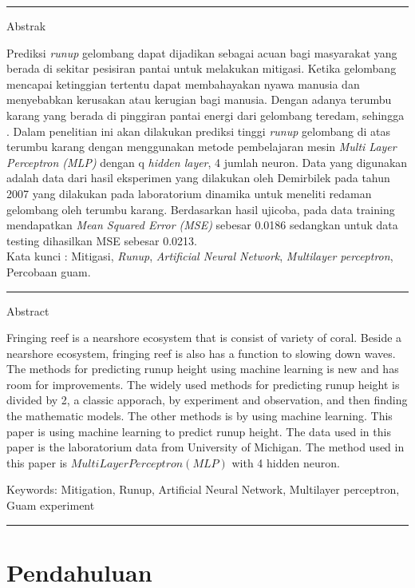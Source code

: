 {\bf \parindent0pt \noindent\rule{\textwidth}{1pt}
Abstrak

Prediksi \emph{runup} gelombang dapat dijadikan sebagai acuan bagi masyarakat yang berada di sekitar pesisiran pantai untuk melakukan mitigasi. Ketika gelombang mencapai ketinggian tertentu dapat membahayakan nyawa manusia dan menyebabkan kerusakan atau kerugian bagi manusia. Dengan adanya terumbu karang yang berada di pinggiran pantai energi dari gelombang teredam, sehingga . Dalam penelitian ini akan dilakukan prediksi tinggi \emph{runup} gelombang di atas terumbu karang dengan menggunakan metode pembelajaran mesin \emph{Multi Layer Perceptron (MLP)} dengan q \emph{hidden layer}, 4 jumlah neuron. Data yang digunakan adalah data dari hasil eksperimen yang dilakukan oleh Demirbilek pada tahun 2007 yang dilakukan pada laboratorium dinamika untuk meneliti redaman gelombang oleh terumbu karang. Berdasarkan hasil ujicoba, pada data training mendapatkan \emph{Mean Squared Error (MSE)} sebesar 0.0186 sedangkan untuk data testing dihasilkan MSE sebesar 0.0213.\\

Kata kunci : Mitigasi, \emph{Runup}, \emph{Artificial Neural Network}, \emph{Multilayer perceptron}, Percobaan guam.


\noindent\rule{\textwidth}{1pt}
Abstract

Fringing reef is a nearshore ecosystem that is consist of variety of coral. Beside a nearshore ecosystem, fringing reef is also has a function to slowing down waves. The methods for predicting runup height using machine learning is new and has room for improvements. The widely used methods for predicting runup height is divided by 2, a classic apporach, by experiment and observation, and then finding the mathematic models. The other methods is by using machine learning. This paper is using machine learning to predict runup height. The data used in this paper is the laboratorium data from University of Michigan. The method used in this paper is $Multi Layer Perceptron(MLP)$ with 4 hidden neuron.

 \bigskip
Keywords: Mitigation, Runup, Artificial Neural Network, Multilayer perceptron, Guam experiment

\noindent\rule{\textwidth}{1pt} }


\section{Pendahuluan}


